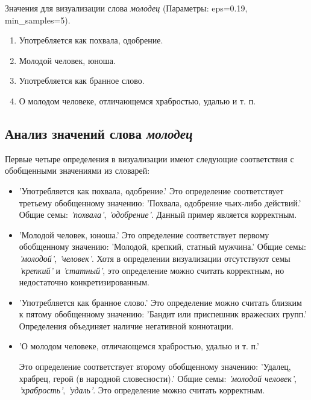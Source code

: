 Значения для визуализации слова \textit{молодец} (Параметры: eps=0.19, min\_samples=5).

\begin{enumerate}
    \item Употребляется как похвала, одобрение.
    \item Молодой человек, юноша.
    \item Употребляется как бранное слово.
    \item О молодом человеке, отличающемся храбростью, удалью и т. п.
\end{enumerate}

\subsection*{Анализ значений слова \textit{молодец}}

Первые четыре определения в визуализации имеют следующие соответствия с обобщенными значениями из словарей:

\begin{itemize}
    \item ’Употребляется как похвала, одобрение.’
Это определение соответствует третьему обобщенному значению:
’Похвала, одобрение чьих-либо действий.’ Общие семы: \textit{’похвала’}, \textit{’одобрение’}.
Данный пример является корректным.

    \item ’Молодой человек, юноша.’
    Это определение соответствует первому обобщенному значению:
    ’Молодой, крепкий, статный мужчина.’
    Общие семы: \textit{’молодой’}, \textit{’человек’}.
    Хотя в определении визуализации отсутствуют семы \textit{’крепкий’} и \textit{’статный’}, это определение можно считать корректным, но недостаточно конкретизированным.

    \item ’Употребляется как бранное слово.’
    Это определение можно считать близким к пятому обобщенному значению:
    ’Бандит или приспешник вражеских групп.’
    Определения объединяет наличие негативной коннотации.

    \item ’О молодом человеке, отличающемся храбростью, удалью и т. п.’

    Это определение соответствует второму обобщенному значению:
    ’Удалец, храбрец, герой (в народной словесности).’
    Общие семы: \textit{’молодой человек’}, \textit{’храбрость’}, \textit{’удаль’}.
    Это определение можно считать корректным.

\end{itemize}

